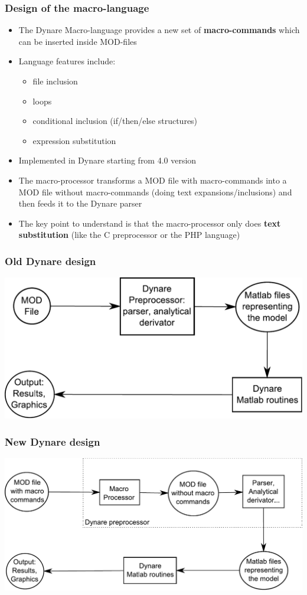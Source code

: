 \documentclass{beamer}
\begin{document}
\begin{frame}
  \frametitle{Design of the macro-language}
  \begin{itemize}
  \item The Dynare Macro-language provides a new set of \textbf{macro-commands} which can be inserted inside MOD-files
  \item Language features include:
    \begin{itemize}
    \item file inclusion
    \item loops
    \item conditional inclusion (if/then/else structures)
    \item expression substitution
    \end{itemize}
  \item Implemented in Dynare starting from 4.0 version
  \item The macro-processor transforms a MOD file with macro-commands into a MOD file without macro-commands (doing text expansions/inclusions) and then feeds it to the Dynare parser
  \item The key point to understand is that the macro-processor only does \textbf{text substitution} (like the C preprocessor or the PHP language)
  \end{itemize}
\end{frame}

\begin{frame}
  \frametitle{Old Dynare design}
  \includegraphics[width=0.95\linewidth]{old-design.pdf}
\end{frame}

\begin{frame}
  \frametitle{New Dynare design}
  \includegraphics[width=0.95\linewidth]{new-design.pdf}
\end{frame}
\end{document}
